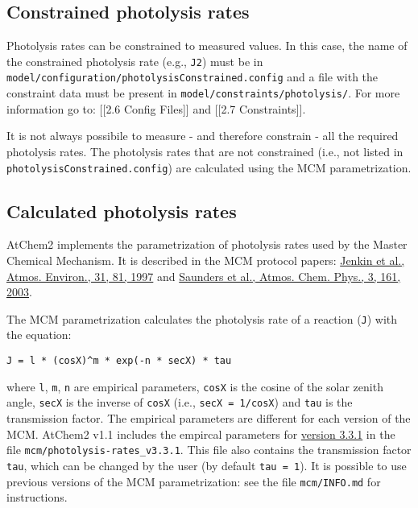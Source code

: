 \subsection{Constrained photolysis rates}\label{constrained-photolysis-rates}

Photolysis rates can be constrained to measured values. In this case,
the name of the constrained photolysis rate (e.g., \texttt{J2}) must be
in \texttt{model/configuration/photolysisConstrained.config} and a file
with the constraint data must be present in
\texttt{model/constraints/photolysis/}. For more information go to:
{[}{[}2.6 Config Files{]}{]} and {[}{[}2.7 Constraints{]}{]}.

It is not always possibile to measure - and therefore constrain - all
the required photolysis rates. The photolysis rates that are not
constrained (i.e., not listed in \texttt{photolysisConstrained.config})
are calculated using the MCM parametrization.

\subsection{Calculated photolysis rates}\label{calculated-photolysis-rates}

AtChem2 implements the parametrization of photolysis rates used by the
Master Chemical Mechanism. It is described in the MCM protocol papers:
\href{https://doi.org/10.1016/S1352-2310(96)00105-7}{Jenkin et al.,
Atmos. Environ., 31, 81, 1997} and
\href{https://doi.org/10.5194/acp-3-161-2003}{Saunders et al., Atmos.
Chem. Phys., 3, 161, 2003}.

The MCM parametrization calculates the photolysis rate of a reaction
(\texttt{J}) with the equation:

\begin{verbatim}
J = l * (cosX)^m * exp(-n * secX) * tau
\end{verbatim}

where \texttt{l}, \texttt{m}, \texttt{n} are empirical parameters,
\texttt{cosX} is the cosine of the solar zenith angle, \texttt{secX} is
the inverse of \texttt{cosX} (i.e., \texttt{secX\ =\ 1/cosX}) and
\texttt{tau} is the transmission factor. The empirical parameters are
different for each version of the MCM. AtChem2 v1.1 includes the
empircal parameters for
\href{http://mcm.leeds.ac.uk/MCM/parameters/photolysis_param.htt}{version
3.3.1} in the file \texttt{mcm/photolysis-rates\_v3.3.1}. This file also
contains the transmission factor \texttt{tau}, which can be changed by
the user (by default \texttt{tau\ =\ 1}). It is possible to use previous
versions of the MCM parametrization: see the file \texttt{mcm/INFO.md}
for instructions.

